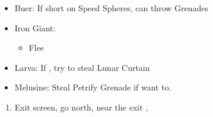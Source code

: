 \begin{encounters}
	\begin{itemize}
		\item Buer: If short on Speed Spheres, can throw Grenades
		\item Iron Giant:
		      \begin{itemize}
			      \switch{\tidus}{\rikku}
			      \rikkuf Steal Light Curtain
			      \switch{\wakka}{\tidus}
			      \tidusf Defend
			      \enemyf Attacks \rikku
			      \auronf Defend
			      \item Flee
		      \end{itemize}
		\item Larva: If \blitzloss, try to steal Lunar Curtain
		\item Melusine: Steal Petrify Grenade if want to.
	\end{itemize}
\end{encounters}
\begin{enumerate}[resume]
	\item Exit screen, go north, near the exit \sd, \cs[3:10]
\end{enumerate}